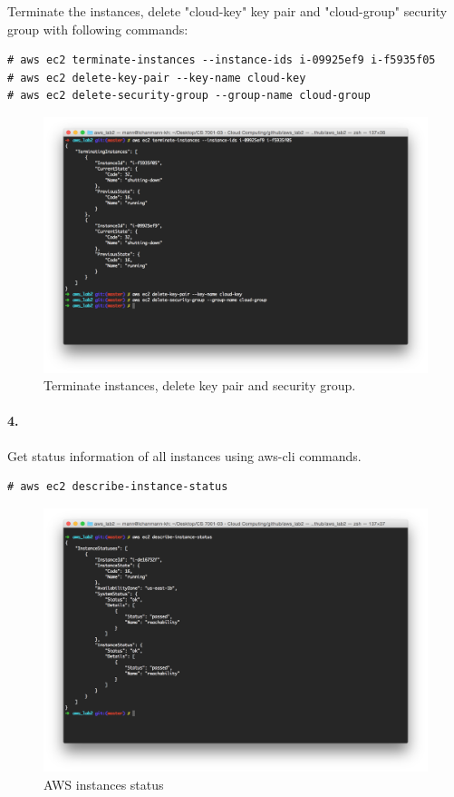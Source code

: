 \documentclass[a4paper]{article}
\begin{document}
Terminate the instances, delete "cloud-key" key pair and "cloud-group" security group with following commands: 
\begin{verbatim}
# aws ec2 terminate-instances --instance-ids i-09925ef9 i-f5935f05
# aws ec2 delete-key-pair --key-name cloud-key
# aws ec2 delete-security-group --group-name cloud-group
\end{verbatim}
\begin{figure}[H]
  \centering
    \includegraphics[scale=.4]{terminate_instances.png}
  \caption{Terminate instances, delete key pair and security group.}
\end{figure}

\paragraph{4. } Get status information of all instances using aws-cli commands.
\begin{verbatim}
# aws ec2 describe-instance-status
\end{verbatim}
\begin{figure}[H]
  \centering
    \includegraphics[scale=.4]{instance_status.png}
  \caption{AWS instances status}
\end{figure}
\end{document}
